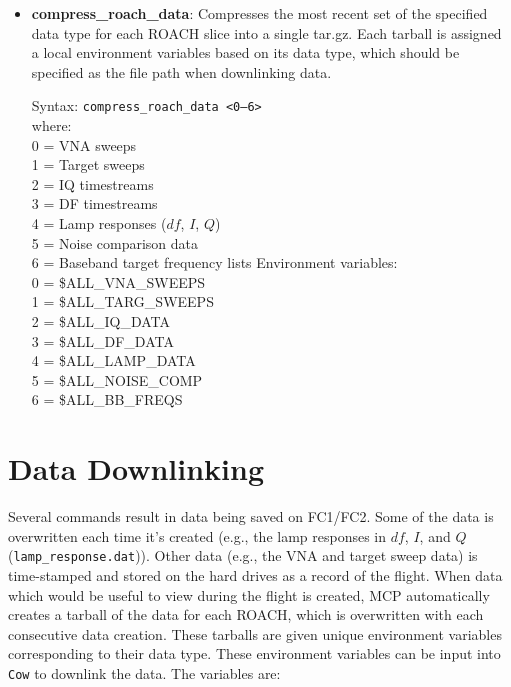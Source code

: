 \begin{itemize}[leftmargin=*,label={}]

\item \textbf{compress\_roach\_data}: Compresses the most recent set of the specified data type for each ROACH slice into a single tar.gz. Each tarball is assigned a local environment variables based on its data type, which should be specified as the file path when downlinking data.

Syntax: \texttt{compress\_roach\_data <0--6>}\\
where:\\
0 = VNA sweeps\\
1 = Target sweeps\\
2 = IQ timestreams\\
3 = DF timestreams\\
4 = Lamp responses ($df$, $I$, $Q$)\\
5 = Noise comparison data\\
6 = Baseband target frequency lists\newline\newline
Environment variables:\\
0 = \$ALL\_VNA\_SWEEPS\\
1 = \$ALL\_TARG\_SWEEPS\\
2 = \$ALL\_IQ\_DATA\\
3 = \$ALL\_DF\_DATA\\
4 = \$ALL\_LAMP\_DATA\\
5 = \$ALL\_NOISE\_COMP\\
6 = \$ALL\_BB\_FREQS\\

\end{itemize}

\section{Data Downlinking}

Several commands result in data being saved on FC1/FC2. Some of the data is overwritten each time it’s created (e.g., the lamp responses in $df$, $I$, and $Q$ (\texttt{lamp\_response.dat})). Other data (e.g., the VNA and target sweep data) is time-stamped and stored on the hard drives as a record of the flight. When data which would be useful to view during the flight is created, MCP automatically creates a tarball of the data for each ROACH, which is overwritten with each consecutive data creation. These tarballs are given unique environment variables corresponding to their data type. These environment variables can be input into \texttt{Cow} to downlink the data. The variables are:

